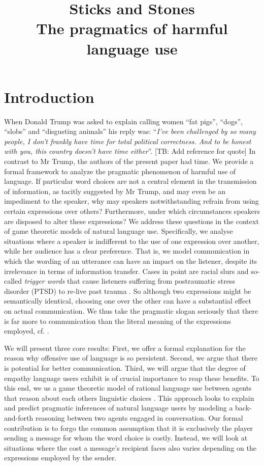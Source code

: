 \documentclass[10pt]{article}
\title{%
  Sticks and Stones \\
  \large The pragmatics of harmful language use}
\newcommand{\tb}[1]{\textcolor[rgb]{.8,.33,.0}{[TB: #1]}}%
\begin{document}
\maketitle

\section{Introduction}
When Donald Trump was asked to explain calling women ``fat pigs'', ``dogs'', ``slobs'' and ``disgusting animals'' his reply was: ``\textit{I’ve been challenged by so many people, I don’t frankly have time for total political correctness. And to be honest with you, this country doesn’t have time either}''. \tb{Add reference for quote}
In contrast to Mr Trump, the authors of the present paper had time. We provide a formal framework to analyze the pragmatic phenomenon of harmful use of language. If particular word choices are not a central element in the transmission of information, as tacitly suggested by Mr Trump, and may even be an impediment to the speaker, why may speakers notwithstanding refrain from using certain expressions over others? Furthermore, under which circumstances speakers are disposed to alter these expressions? We address these questions in the context of game theoretic models of natural language use. Specifically, we analyse situations where a speaker is indifferent to the use of one expression over another, while her audience has a clear preference. That is, we model communication in which the wording of an utterance can have an impact on the listener, despite its irrelevance in terms of information transfer. Cases in point are racial slurs and so-called \textit{trigger words} that cause listeners suffering from postraumatic stress disorder (PTSD) to re-live past trauma \cite{fagan2004confronting, yehuda2002post}. So although two expressions might be semantically identical, choosing one over the other can have a substantial effect on actual communication. We thus take the pragmatic slogan seriously that there is far more to communication than the literal meaning of the expressions employed, cf. \cite{grice1975logic}. %

We will present three core results: First, we offer a formal explanation for the reason why offensive use of language is so persistent. Second, we argue that there is potential for better communication. Third, we will argue that the degree of empathy language users exhibit is of crucial importance to reap these benefits. To this end, we us a game theoretic model of rational language use between agents that reason about each others linguistic choices \cite{franke2014pragmatic}. This approach looks to explain and predict pragmatic inferences of natural language users by modeling a back-and-forth reasoning between two agents engaged in conversation.
Our formal contribution is to forgo the common assumption that it is exclusively the player sending a message for whom the word choice is costly. Instead, we will look at situations where the cost a message's recipient faces also varies depending on the expressions employed by the sender.
\end{document}
